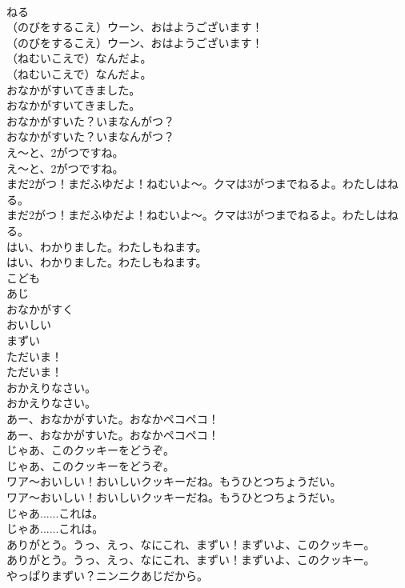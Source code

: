 \documentclass[8pt]{extreport}
\begin{document}
\begin{CJK}{UTF8}{min}
\\	ねる
\\	（のびをするこえ）ウーン、おはようございます！	
\\	（のびをするこえ）ウーン、おはようございます！ 
\\	（ねむいこえで）なんだよ。	
\\	（ねむいこえで）なんだよ。 
\\	おなかがすいてきました。	
\\	おなかがすいてきました。 
\\	おなかがすいた？いまなんがつ？	
\\	おなかがすいた？いまなんがつ？ 
\\	え～と、2がつですね。	
\\	え～と、2がつですね。 
\\	まだ2がつ！まだふゆだよ！ねむいよ～。クマは3がつまでねるよ。わたしはねる。	
\\	まだ2がつ！まだふゆだよ！ねむいよ～。クマは3がつまでねるよ。わたしはねる。 
\\	はい、わかりました。わたしもねます。	
\\	はい、わかりました。わたしもねます。 
\\	こども
\\	あじ
\\	おなかがすく
\\	おいしい
\\	まずい
\\	ただいま！	
\\	ただいま！ 
\\	おかえりなさい。	
\\	おかえりなさい。 
\\	あー、おなかがすいた。おなかペコペコ！	
\\	あー、おなかがすいた。おなかペコペコ！ 
\\	じゃあ、このクッキーをどうぞ。	
\\	じゃあ、このクッキーをどうぞ。 
\\	ワア〜おいしい！おいしいクッキーだね。もうひとつちょうだい。	
\\	ワア〜おいしい！おいしいクッキーだね。もうひとつちょうだい。 
\\	じゃあ......これは。	
\\	じゃあ......これは。 
\\	ありがとう。うっ、えっ、なにこれ、まずい！まずいよ、このクッキー。	
\\	ありがとう。うっ、えっ、なにこれ、まずい！まずいよ、このクッキー。 
\\	やっぱりまずい？ニンニクあじだから。	

\end{CJK}
\end{document}
